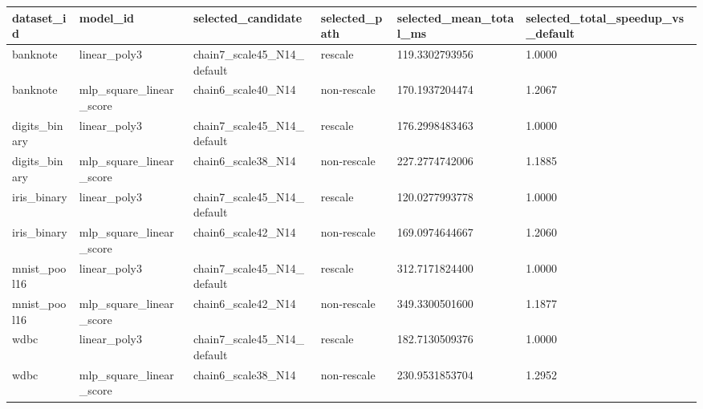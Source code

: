 \begin{tabular}{llllll}
\toprule
dataset_id & model_id & selected_candidate & selected_path & selected_mean_total_ms & selected_total_speedup_vs_default \\
\midrule
banknote & linear\_poly3 & chain7\_scale45\_N14\_default & rescale & 119.3302793956 & 1.0000 \\
banknote & mlp\_square\_linear\_score & chain6\_scale40\_N14 & non-rescale & 170.1937204474 & 1.2067 \\
digits\_binary & linear\_poly3 & chain7\_scale45\_N14\_default & rescale & 176.2998483463 & 1.0000 \\
digits\_binary & mlp\_square\_linear\_score & chain6\_scale38\_N14 & non-rescale & 227.2774742006 & 1.1885 \\
iris\_binary & linear\_poly3 & chain7\_scale45\_N14\_default & rescale & 120.0277993778 & 1.0000 \\
iris\_binary & mlp\_square\_linear\_score & chain6\_scale42\_N14 & non-rescale & 169.0974644667 & 1.2060 \\
mnist\_pool16 & linear\_poly3 & chain7\_scale45\_N14\_default & rescale & 312.7171824400 & 1.0000 \\
mnist\_pool16 & mlp\_square\_linear\_score & chain6\_scale42\_N14 & non-rescale & 349.3300501600 & 1.1877 \\
wdbc & linear\_poly3 & chain7\_scale45\_N14\_default & rescale & 182.7130509376 & 1.0000 \\
wdbc & mlp\_square\_linear\_score & chain6\_scale38\_N14 & non-rescale & 230.9531853704 & 1.2952 \\
\bottomrule
\end{tabular}
